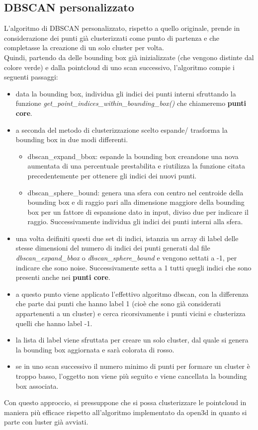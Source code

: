 \documentclass[italian]{report}
\begin{document}
\subsection{DBSCAN personalizzato}
L'algoritmo di DBSCAN personalizzato, rispetto a quello originale, prende in considerazione dei punti già clusterizzati come punto di partenza e che completasse la creazione di un solo cluster per volta.\\
Quindi, partendo da delle bounding box già inizializzate (che vengono distinte dal colore verde) e dalla pointcloud di uno scan successivo, l'algoritmo compie i seguenti passaggi:
\begin{itemize}
	\item data la bounding box, individua gli indici dei punti interni sfruttando la funzione \textit{get\_point\_indices\_within\_bounding\_box()} che chiameremo \textbf{punti core}.
	\item a seconda del metodo di clusterizzazione scelto espande/ trasforma la bounding box in due modi differenti.
		\begin{itemize}
			\item dbscan\_expand\_bbox: espande la bounding box creandone una nova aumentata di una percentuale prestabilita e riutilizza la funzione citata precedentemente per ottenere gli indici dei nuovi punti.
			\item dbscan\_sphere\_bound: genera una sfera con centro nel centroide della bounding box e di raggio pari alla dimensione maggiore della bounding box per un fattore di espansione dato in input, diviso due 					per indicare il raggio. Successivamente individua gli indici dei punti interni alla sfera.
		\end{itemize}
	\item una volta deifiniti questi due set di indici, istanzia un array di label delle stesse dimensioni del numero di indici dei punti generati dal file \textit{dbscan\_expand\_bbox} o \textit{dbscan\_sphere\_bound} e vengono settati a -1, per indicare che sono noise. Successivamente setta a 1 tutti quegli indici che sono presenti anche nei \textbf{punti core}.
	\item a questo punto viene applicato l'effettivo algoritmo dbscan, con la differenza che parte dai punti che hanno label 1 (cioè che sono già considerati appartenenti a un cluster) e cerca ricorsivamente i punti vicini e clusterizza quelli che hanno label -1.
	\item la lista di label viene sfruttata per creare un solo cluster, dal quale si genera la bounding box aggiornata e sarà colorata di rosso.
	\item se in uno scan successivo il numero minimo di punti per formare un cluster è troppo basso, l'oggetto non viene più seguito e viene cancellata la bounding box associata.
\end{itemize}
Con questo approccio, si pressuppone che si possa clusterizzare le pointcloud in maniera più efficace rispetto all'algoritmo implementato da open3d in quanto si parte con luster già avviati.\\
\end{document}
